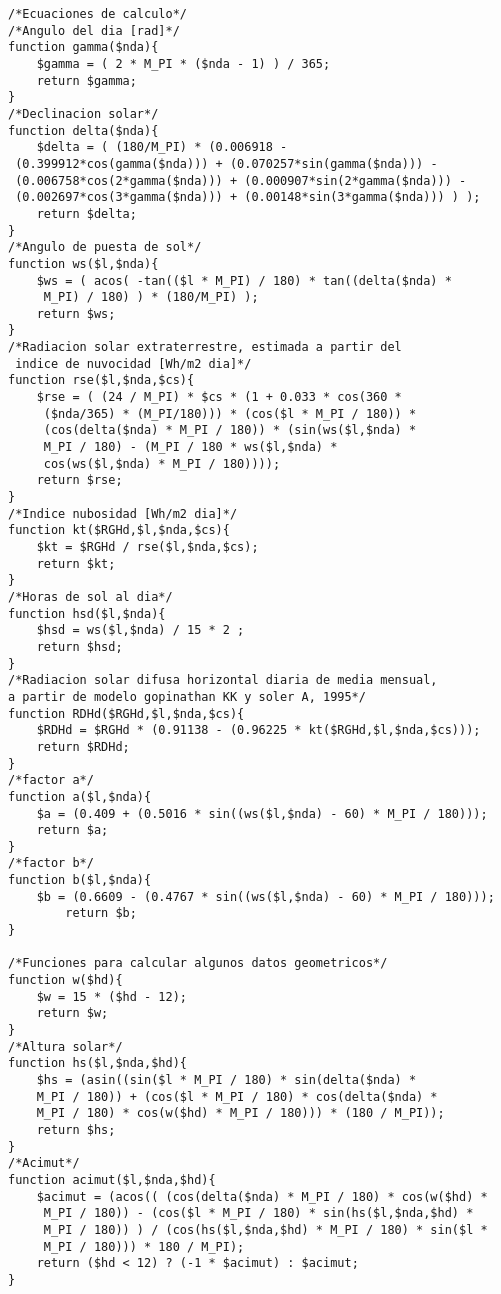 \begin{verbatim}
/*Ecuaciones de calculo*/
/*Angulo del dia [rad]*/
function gamma($nda){
	$gamma = ( 2 * M_PI * ($nda - 1) ) / 365;
	return $gamma;
}
/*Declinacion solar*/
function delta($nda){
	$delta = ( (180/M_PI) * (0.006918 -
 (0.399912*cos(gamma($nda))) + (0.070257*sin(gamma($nda))) -
 (0.006758*cos(2*gamma($nda))) + (0.000907*sin(2*gamma($nda))) -
 (0.002697*cos(3*gamma($nda))) + (0.00148*sin(3*gamma($nda))) ) );
	return $delta;
}
/*Angulo de puesta de sol*/
function ws($l,$nda){
	$ws = ( acos( -tan(($l * M_PI) / 180) * tan((delta($nda) *
	 M_PI) / 180) ) * (180/M_PI) );
	return $ws;
}
/*Radiacion solar extraterrestre, estimada a partir del
 indice de nuvocidad [Wh/m2 dia]*/
function rse($l,$nda,$cs){
	$rse = ( (24 / M_PI) * $cs * (1 + 0.033 * cos(360 *
	 ($nda/365) * (M_PI/180))) * (cos($l * M_PI / 180)) *
	 (cos(delta($nda) * M_PI / 180)) * (sin(ws($l,$nda) *
	 M_PI / 180) - (M_PI / 180 * ws($l,$nda) *
	 cos(ws($l,$nda) * M_PI / 180))));
	return $rse;
}
/*Indice nubosidad [Wh/m2 dia]*/
function kt($RGHd,$l,$nda,$cs){
	$kt = $RGHd / rse($l,$nda,$cs);
	return $kt;
}
/*Horas de sol al dia*/
function hsd($l,$nda){
	$hsd = ws($l,$nda) / 15 * 2 ;
	return $hsd;
}
/*Radiacion solar difusa horizontal diaria de media mensual, 
a partir de modelo gopinathan KK y soler A, 1995*/
function RDHd($RGHd,$l,$nda,$cs){
	$RDHd = $RGHd * (0.91138 - (0.96225 * kt($RGHd,$l,$nda,$cs)));
	return $RDHd;
}
/*factor a*/
function a($l,$nda){
	$a = (0.409 + (0.5016 * sin((ws($l,$nda) - 60) * M_PI / 180)));
	return $a;
}
/*factor b*/
function b($l,$nda){
	$b = (0.6609 - (0.4767 * sin((ws($l,$nda) - 60) * M_PI / 180)));
        return $b;
}

/*Funciones para calcular algunos datos geometricos*/
function w($hd){
	$w = 15 * ($hd - 12);
	return $w;
}
/*Altura solar*/
function hs($l,$nda,$hd){
	$hs = (asin((sin($l * M_PI / 180) * sin(delta($nda) * 
	M_PI / 180)) + (cos($l * M_PI / 180) * cos(delta($nda) *
	M_PI / 180) * cos(w($hd) * M_PI / 180))) * (180 / M_PI));
	return $hs;
}
/*Acimut*/
function acimut($l,$nda,$hd){
	$acimut = (acos(( (cos(delta($nda) * M_PI / 180) * cos(w($hd) *
	 M_PI / 180)) - (cos($l * M_PI / 180) * sin(hs($l,$nda,$hd) *
	 M_PI / 180)) ) / (cos(hs($l,$nda,$hd) * M_PI / 180) * sin($l *	
	 M_PI / 180))) * 180 / M_PI);
	return ($hd < 12) ? (-1 * $acimut) : $acimut;
}	 


\end{verbatim}
